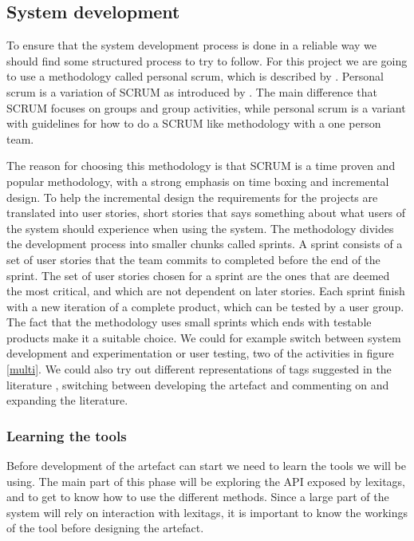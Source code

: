 \subsection{System development}
To ensure that the system development process is done in a reliable way we should find some structured process to try to follow.
For this project we are going to use a methodology called personal scrum, which is described by \citet{Pruitt2011}.
Personal scrum is a variation of SCRUM as introduced by \citet{Schwaber1995}. 
The main difference that SCRUM focuses on groups and group activities, while personal scrum is a variant with guidelines for how to do a SCRUM like methodology with a one person team.

The reason for choosing this methodology is that SCRUM is a time proven and popular methodology, with a strong emphasis on time boxing and incremental design.
To help the incremental design the requirements for the projects are translated into user stories,
short stories that says something about what users of the system should experience when using the system.
The methodology divides the development process into smaller chunks called sprints. 
A sprint consists of a set of user stories that the team commits to completed before the end of the sprint.
The set of user stories chosen for a sprint are the ones that are deemed the most critical, and which are not dependent on later stories. 
Each sprint finish with a new iteration of a complete product, which can be tested by a user group.
The fact that the methodology uses small sprints which ends with testable products make it a suitable choice.
We could for example switch between system development and experimentation or user testing, two of the activities in figure \ref{multi}.
We could also try out different representations of tags suggested in the literature \citep{Mika2005,Gruber2007,Scerri2008}, 
switching between developing the artefact and commenting on and expanding the literature.

\subsubsection{Learning the tools}
Before development of the artefact can start we need to learn the tools we will be using. 
The main part of this phase will be exploring the API exposed by lexitags, and to get to know how to use the different methods.
Since a large part of the system will rely on interaction with lexitags, it is important to know the workings of the tool before designing the artefact.

